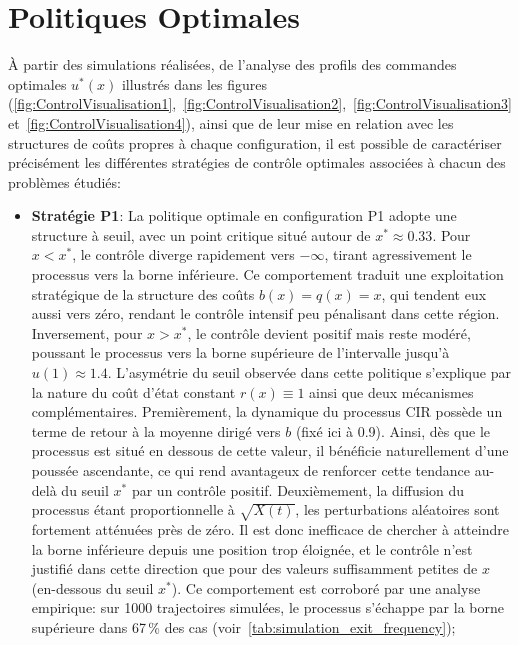 \section{Politiques Optimales}
À partir des simulations réalisées, de l'analyse des profils des commandes optimales \( u^*(x) \) illustrés dans les figures (\ref{fig:ControlVisualisation1},~\ref{fig:ControlVisualisation2},~\ref{fig:ControlVisualisation3} et~\ref{fig:ControlVisualisation4}), ainsi que de leur mise en relation avec les structures de coûts propres à chaque configuration, il est possible de caractériser précisément les différentes stratégies de contrôle optimales associées à chacun des problèmes étudiés:
\begin{itemize}
    \item \textbf{Stratégie P1}: La politique optimale en configuration P1 adopte une structure à seuil, avec un point critique situé autour de \(x^* \approx 0.33\). Pour \(x < x^*\), le contrôle diverge rapidement vers \(-\infty\), tirant agressivement le processus vers la borne inférieure. Ce comportement traduit une exploitation stratégique de la structure des coûts \(b(x) = q(x) = x\), qui tendent eux aussi vers zéro, rendant le contrôle intensif peu pénalisant dans cette région. Inversement, pour \(x > x^*\), le contrôle devient positif mais reste modéré, poussant le processus vers la borne supérieure de l'intervalle jusqu'à \(u(1)\approx1.4\). L'asymétrie du seuil observée dans cette politique s'explique par la nature du coût d'état constant \(r(x)\equiv1\) ainsi que deux mécanismes complémentaires. Premièrement, la dynamique du processus \acs{CIR} possède un terme de retour à la moyenne dirigé vers \(b\) (fixé ici à 0.9). Ainsi, dès que le processus est situé en dessous de cette valeur, il bénéficie naturellement d'une poussée ascendante, ce qui rend avantageux de renforcer cette tendance au-delà du seuil \(x^*\) par un contrôle positif. Deuxièmement, la diffusion du processus étant proportionnelle à \(\sqrt{X(t)}\), les perturbations aléatoires sont fortement atténuées près de zéro. Il est donc inefficace de chercher à atteindre la borne inférieure depuis une position trop éloignée, et le contrôle n'est justifié dans cette direction que pour des valeurs suffisamment petites de \(x\) (en-dessous du seuil $x^*$). Ce comportement est corroboré par une analyse empirique: sur 1000 trajectoires simulées, le processus s'échappe par la borne supérieure dans 67\,\% des cas (voir~\ref{tab:simulation_exit_frequency});

\end{itemize}
